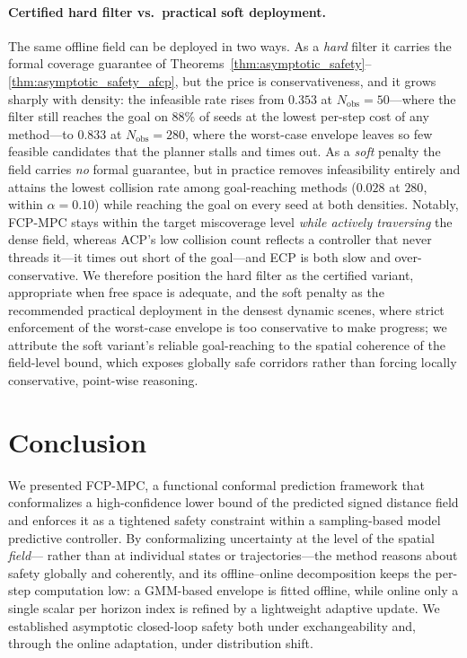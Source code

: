 \documentclass[lettersize,journal]{IEEEtran}
\begin{document}
\paragraph{Certified hard filter vs.\ practical soft deployment.}
The same offline field can be deployed in two ways. As a \emph{hard} filter it carries the
formal coverage guarantee of Theorems~\ref{thm:asymptotic_safety}--\ref{thm:asymptotic_safety_afcp},
but the price is conservativeness, and it grows sharply with density: the infeasible rate
rises from $0.353$ at $N_{\mathrm{obs}}=50$---where the filter still reaches the goal on
$88\%$ of seeds at the lowest per-step cost of any method---to $0.833$ at $N_{\mathrm{obs}}=280$,
where the worst-case envelope leaves so few feasible candidates that the planner stalls and
times out. As a \emph{soft} penalty the field carries \emph{no} formal guarantee, but in
practice removes infeasibility entirely and attains the lowest collision rate among
goal-reaching methods ($0.028$ at $280$, within $\alpha=0.10$) while reaching the goal on
every seed at both densities.
Notably, FCP-MPC stays within the target miscoverage level \emph{while actively traversing}
the dense field, whereas ACP's low collision count reflects a controller that never threads
it---it times out short of the goal---and ECP is both slow and over-conservative.
We therefore position the hard filter as the certified variant, appropriate when free space
is adequate, and the soft penalty as the recommended practical deployment in the densest
dynamic scenes, where strict enforcement of the worst-case envelope is too conservative to
make progress; we attribute the soft variant's
reliable goal-reaching to the spatial coherence of the field-level bound, which exposes
globally safe corridors rather than forcing locally conservative, point-wise reasoning.

\section{Conclusion}

We presented FCP-MPC, a functional conformal prediction framework that conformalizes
a high-confidence lower bound of the predicted signed distance field and enforces
it as a tightened safety constraint within a sampling-based model predictive
controller. By conformalizing uncertainty at the level of the spatial \emph{field}---
rather than at individual states or trajectories---the method reasons about safety
globally and coherently, and its offline--online decomposition keeps the per-step
computation low: a GMM-based envelope is fitted offline, while online only a
single scalar per horizon index is refined by a lightweight adaptive update. We
established asymptotic closed-loop safety both under exchangeability and, through
the online adaptation, under distribution shift.
\end{document}
